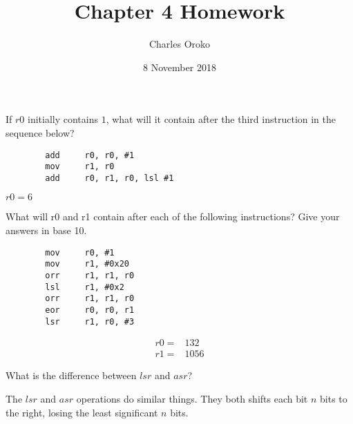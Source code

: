 \documentclass[12pt]{article}
\newenvironment{problem}[2][Problem]{\begin{trivlist}
\item[\hskip \labelsep {\bfseries #1}\hskip \labelsep {\bfseries #2.}]}{\end{trivlist}}
\begin{document}
 
 
\title{Chapter 4 Homework}%
\author{Charles Oroko} %
\date{8 November 2018}
\maketitle


\begin{problem}{4.1}
    If $r0$ initially contains $1$, what will it contain after the third instruction in the sequence below?
    \begin{verbatim}
        add     r0, r0, #1
        mov     r1, r0
        add     r0, r1, r0, lsl #1
    \end{verbatim}

\end{problem}

$r0=6$


\begin{problem}{4.2}
    What will r0 and r1 contain after each of the following instructions? Give your answers in base 10.
    \begin{verbatim}
        mov     r0, #1
        mov     r1, #0x20
        orr     r1, r1, r0
        lsl     r1, #0x2
        orr     r1, r1, r0
        eor     r0, r0, r1
        lsr     r1, r0, #3
    \end{verbatim}

\end{problem}

\begin{align*}
    r0 = & 132 \\
    r1 = & 1056
\end{align*}


\begin{problem}{4.3}
    What is the difference between $lsr$ and $asr$?
\end{problem}

The $lsr$ and $asr$ operations do similar things. They both shifts each bit $n$ bits to the right, losing the least significant $n$ bits.
\end{document}
